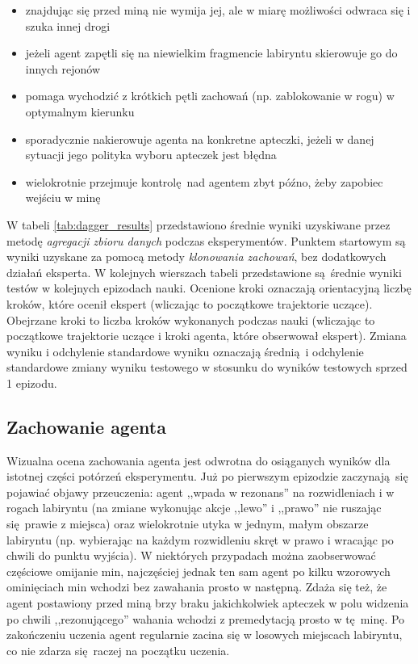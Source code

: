 \begin{itemize}
\item{znajdując się przed miną nie wymija jej, ale w miarę możliwości odwraca się i szuka innej drogi}
\item{jeżeli agent zapętli się na niewielkim fragmencie labiryntu skierowuje go do innych rejonów}
\item{pomaga wychodzić z krótkich pętli zachowań (np. zablokowanie w rogu) w optymalnym kierunku}
\item{sporadycznie nakierowuje agenta na konkretne apteczki, jeżeli w danej sytuacji jego polityka wyboru apteczek jest błędna}
\item{wielokrotnie przejmuje kontrolę nad agentem zbyt późno, żeby zapobiec wejściu w minę}
\end{itemize}

W tabeli \ref{tab:dagger_results} przedstawiono średnie wyniki uzyskiwane przez metodę \textit{agregacji zbioru danych} podczas eksperymentów. Punktem startowym są wyniki uzyskane za pomocą metody \textit{klonowania zachowań}, bez dodatkowych działań eksperta. W kolejnych wierszach tabeli przedstawione są średnie wyniki testów w kolejnych epizodach nauki. Ocenione kroki oznaczają orientacyjną liczbę kroków, które ocenił ekspert (wliczając to początkowe trajektorie uczące). Obejrzane kroki to liczba kroków wykonanych podczas nauki (wliczając to początkowe trajektorie uczące i kroki agenta, które obserwował ekspert). Zmiana wyniku i odchylenie standardowe wyniku oznaczają średnią i odchylenie standardowe zmiany wyniku testowego w stosunku do wyników testowych sprzed 1 epizodu. 

\begin{figure}[H]
\end{figure}

\subsection {Zachowanie agenta}
Wizualna ocena zachowania agenta jest odwrotna do osiąganych wyników dla istotnej części potórzeń eksperymentu. Już po pierwszym epizodzie zaczynają się pojawiać objawy przeuczenia: agent ,,wpada w rezonans'' na rozwidleniach i w rogach labiryntu (na zmiane wykonując akcje ,,lewo'' i ,,prawo'' nie ruszając się prawie z miejsca) oraz wielokrotnie utyka w jednym, małym obszarze labiryntu (np. wybierając na każdym rozwidleniu skręt w prawo i wracając po chwili do punktu wyjścia). W niektórych przypadach można zaobserwować częściowe omijanie min, najczęściej jednak ten sam agent po kilku wzorowych ominięciach min wchodzi bez zawahania prosto w następną. Zdaża się też, że agent postawiony przed miną brzy braku jakichkolwiek apteczek w polu widzenia po chwili ,,rezonującego'' wahania wchodzi z premedytacją prosto w tę minę. Po zakończeniu uczenia agent regularnie zacina się w losowych miejscach labiryntu, co nie zdarza się raczej na początku uczenia.

